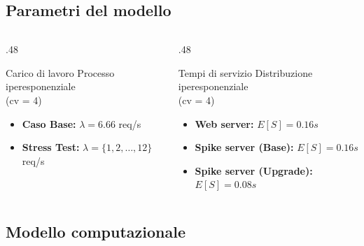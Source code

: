 \subsection{Parametri del modello}
\begin{frame}{\subsecname}
    \begin{columns}[T]
        \begin{column}{.48\textwidth}
            \begin{block}{Carico di lavoro}
                Processo iperesponenziale \\ (cv = 4)
                \begin{itemize}
                    \item \textbf{Caso Base:} \(\lambda = 6.66\) req/s
                    \item \textbf{Stress Test:} \(\lambda = \{1, 2, \ldots, 12\}\) req/s
                \end{itemize}
                \vspace{3.2em}
            \end{block}
        \end{column}
        \begin{column}{.48\textwidth}
            \begin{block}{Tempi di servizio}
                Distribuzione iperesponenziale \\ (cv = 4)
                \begin{itemize}
                    \item \textbf{Web server:} \(E[S] = 0.16 s\)
                    \item \textbf{Spike server (Base):} \(E[S] = 0.16 s\)
                    \item \textbf{Spike server (Upgrade):} \(E[S] = 0.08 s\)
                \end{itemize}
            \end{block}
        \end{column}
    \end{columns}
\end{frame}
\subsection{Modello computazionale}

